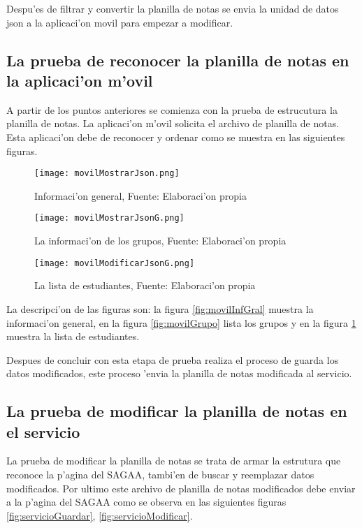 Despu'es de filtrar y convertir la planilla de notas se envia la unidad de datos json a la aplicaci'on movil para empezar a modificar.

\subsection{La prueba de reconocer la planilla de notas en la aplicaci'on m'ovil}
A partir de los puntos anteriores se comienza con la prueba de estrucutura  la planilla de notas. La aplicaci'on m'ovil solicita el archivo de planilla de notas. Esta aplicaci'on debe de reconocer y ordenar como se muestra en las siguientes figuras. 
\begin{figure}[H]
\begin{minipage}{0.33\textwidth}
\centering
\texttt{[image: movilMostrarJson.png]}
\caption{Informaci'on general, Fuente: Elaboraci'on propia}
\label{fig:movilInfGral}
\end{minipage}\hfill
\begin{minipage}{0.33\textwidth}
\centering
\texttt{[image: movilMostrarJsonG.png]}
\caption{La informaci'on de los grupos, Fuente: Elaboraci'on propia}
\label{fig:movilGrupo}
\end{minipage}\hfill
\begin{minipage}{0.33\textwidth}
\centering
\texttt{[image: movilModificarJsonG.png]}
\caption{La lista de estudiantes, Fuente: Elaboraci'on propia}
\label{fig:movilEstudiantes}
\end{minipage}
\end{figure}
La descripci'on de las figuras son: la figura \ref{fig:movilInfGral} muestra la informaci'on general, en la figura \ref{fig:movilGrupo} lista los grupos y en la figura \ref{fig:movilEstudiantes} muestra la lista de estudiantes.  

Despues de concluir con esta etapa de prueba realiza el proceso de guarda los datos modificados, este proceso 'envia la planilla de notas modificada al servicio.

\subsection{La prueba de modificar la planilla de notas en el servicio} 
La prueba de modificar la planilla de notas se trata de  armar la estrutura que reconoce la p'agina del SAGAA, tambi'en de buscar y reemplazar datos modificados. Por ultimo este archivo de planilla de notas modificados debe enviar a la p'agina del SAGAA como se observa en las siguientes figuras  \ref{fig:servicioGuardar}, \ref{fig:servicioModificar}.

